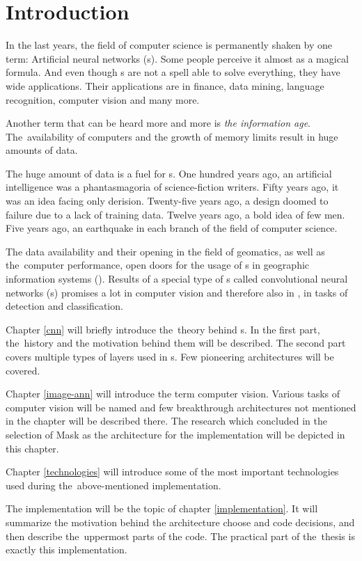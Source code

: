 \chapter{Introduction}
\label{intro}

In the last years, the field of computer science is permanently shaken by one 
term: Artificial neural networks (s). Some people perceive it almost
as a magical formula. And even though s are not a spell able to solve
everything, they have wide applications. Their applications are in finance,
data mining, language recognition, computer vision and many more.

Another term that can be heard more and more is \textit{the information age}.
The~availability of computers and the growth of memory limits result in huge
amounts of data.

The huge amount of data is a fuel for s. One hundred years ago, an
artificial intelligence was a phantasmagoria of science-fiction writers. Fifty
years ago, it was an idea facing only derision. Twenty-five years ago, a design
doomed to failure due to a lack of training data. Twelve years ago, a bold idea
of few men. Five years ago, an earthquake in each branch of the field of
computer science.

The data availability and their opening in the field of geomatics, as well as
the~computer performance, open doors for the usage of s in geographic
information systems (). Results of a special type of s called
convolutional neural networks (s) promises a lot in computer vision and
therefore also in , in tasks of detection and classification.

Chapter \ref{cnn} will briefly introduce the~theory behind s. In the
first part, the~history and the motivation behind them will be described. The
second part covers multiple types of layers used in s. Few pioneering
architectures will be covered.

Chapter \ref{image-ann} will introduce the term computer vision. Various tasks
of computer vision will be named and few breakthrough architectures not 
mentioned in the  chapter will be described there. The research which 
concluded in the selection of Mask  as the architecture for the 
implementation will be depicted in this chapter.

Chapter \ref{technologies} will introduce some of the most important 
technologies used during
the~above-mentioned implementation.

The implementation will be the topic of chapter \ref{implementation}. It will 
summarize the motivation behind the architecture choose and code decisions, and
then describe the~uppermost parts of the code. The practical part of the~thesis
is exactly this implementation.
